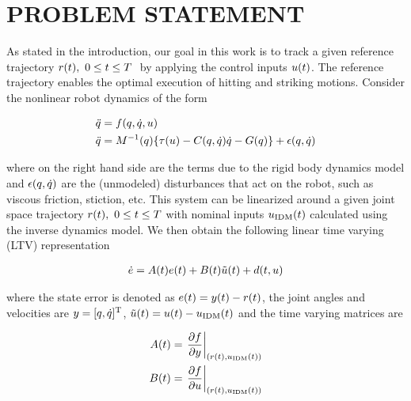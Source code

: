 \section{PROBLEM STATEMENT}\label{problemStatement}

As stated in the introduction, our goal in this work is to track a given reference trajectory $r(t), \ 0 \leq t \leq T \ $ by applying the control inputs $u(t)$. The reference trajectory enables the optimal execution of hitting and striking motions. Consider the nonlinear robot dynamics of the form

\begin{equation}
\begin{aligned}
\ddot{q} &= f(q,\dot{q},u) \\
\ddot{q} &= M^{-1}(q)\{ \tau(u) - C(q,\dot{q})\dot{q} - G(q)\} + \epsilon(q,\dot{q})\\
\end{aligned}
\label{dynamics}
\end{equation}

\noindent where on the right hand side are the terms due to the rigid body dynamics model and $\epsilon(q,\dot{q})$ are the (unmodeled) disturbances that act on the robot, such as viscous friction, stiction, etc. This system can be linearized around a given joint space trajectory $r(t), \ 0 \leq t \leq T$ with nominal inputs $u_{\mathrm{IDM}}(t)$ calculated using the inverse dynamics model. We then obtain the following linear time varying (LTV) representation

\begin{equation}
\begin{aligned}
\dot{e} = A(t)e(t) + B(t)\tilde{u}(t) + d(t,u)
\end{aligned}
\label{LTV}
\end{equation}

\noindent where the state error is denoted as $e(t) = y(t) - r(t)$, the joint angles and velocities are $y = [q,\dot{q}]^{\mathrm{T}}$, $\tilde{u}(t) = u(t) - u_{\mathrm{IDM}}(t)$ and the time varying matrices are

\begin{equation}
\begin{aligned}
A(t) &= \left.\frac{\partial{f}}{\partial{y}}\right|_{(r(t),u_{\mathrm{IDM}}(t))} \\
B(t) &= \left.\frac{\partial{f}}{\partial{u}}\right|_{(r(t),u_{\mathrm{IDM}}(t))}
\end{aligned}
\label{LTVmatrices}
\end{equation}

